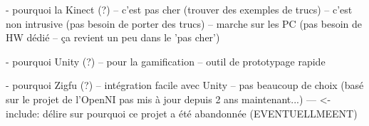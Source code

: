 
- pourquoi la Kinect (?)
-- c'est pas cher (trouver des exemples de trucs)
-- c'est non intrusive (pas besoin de porter des trucs)
-- marche sur les PC (pas besoin de HW dédié -- ça revient un peu dans le 'pas cher')

- pourquoi Unity (?)
-- pour la gamification
-- outil de prototypage rapide

- pourquoi Zigfu (?)
-- intégration facile avec Unity
-- pas beaucoup de choix (basé sur le projet de l'OpenNI pas mis à jour depuis 2 ans maintenant...)
--- <- include: délire sur pourquoi ce projet a été abandonnée (EVENTUELLMEENT)
